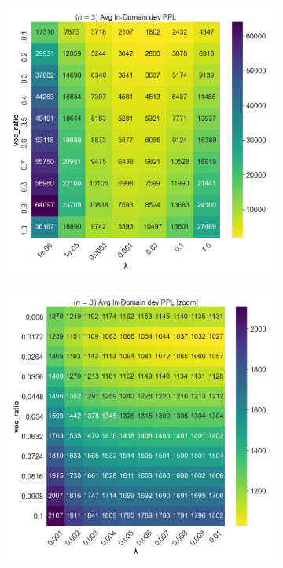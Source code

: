 \documentclass[11pt]{article}
\begin{document}
\begin{figure}[ht]
\begin{subfigure}{0.5\textwidth}
  \includegraphics[width=\textwidth]{figures/n=3.png}
\end{subfigure}
\begin{subfigure}{0.5\textwidth}
  \includegraphics[width=\textwidth]{figures/n=3_zoom.png}
\end{subfigure}


\end{figure}
\end{document}
